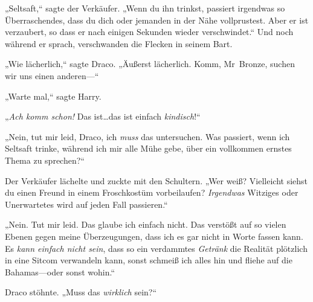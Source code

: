 „Seltsaft,“ sagte der Verkäufer. „Wenn du ihn trinkst, passiert irgendwas so Überraschendes, dass du dich oder jemanden in der Nähe vollprustest. Aber er ist verzaubert, so dass er nach einigen Sekunden wieder verschwindet.“ Und noch während er sprach, verschwanden die Flecken in seinem Bart.

„Wie lächerlich,“ sagte Draco. „Äußerst lächerlich. Komm, Mr~Bronze, suchen wir uns einen anderen—“

„Warte mal,“ sagte Harry.

„\emph{Ach komm schon!} Das ist…das ist einfach \emph{kindisch}!“

„Nein, tut mir leid, Draco, ich \emph{muss} das untersuchen. Was passiert, wenn ich Seltsaft trinke, während ich mir alle Mühe gebe, über ein vollkommen ernstes Thema zu sprechen?“

Der Verkäufer lächelte und zuckte mit den Schultern. „Wer weiß? Vielleicht siehst du einen Freund in einem Froschkostüm vorbeilaufen? \emph{Irgendwas} Witziges oder Unerwartetes wird auf jeden Fall passieren.“

„Nein. Tut mir leid. Das glaube ich einfach nicht. Das verstößt auf so vielen Ebenen gegen meine Überzeugungen, dass ich es gar nicht in Worte fassen kann. Es \emph{kann einfach nicht sein}, dass so ein verdammtes \emph{Getränk} die Realität plötzlich in eine Sitcom verwandeln kann, sonst schmeiß ich alles hin und fliehe auf die Bahamas—oder sonst wohin.“

Draco stöhnte. „Muss das \emph{wirklich} sein?“

